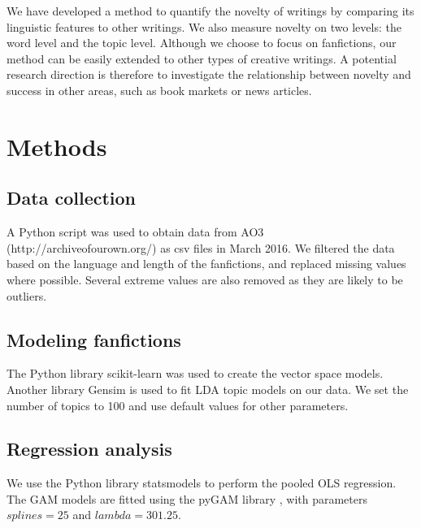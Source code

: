 \documentclass[a4paper]{article}
\begin{document}
We have developed a method to quantify the novelty of writings by comparing its linguistic features to other writings. We also measure novelty on two levels: the word level and the topic level. Although we choose to focus on fanfictions, our method can be easily extended to other types of creative writings. A potential research direction is therefore to investigate the relationship between novelty and success in other areas, such as book markets or news articles. 



\section*{Methods}

\subsection*{Data collection}
A Python script was used to obtain data from AO3 (http://archiveofourown.org/) as csv files in March 2016. We filtered the data based on the language and length of the fanfictions, and replaced missing values where possible. Several extreme values are also removed as they are likely to be outliers.

\subsection*{Modeling fanfictions}
The Python library scikit-learn was used to create the vector space models. Another library Gensim is used to fit LDA topic models on our data. We set the number of topics to 100 and use default values for other parameters. 

\subsection*{Regression analysis}
We use the Python library statsmodels \cite{seabold2010statsmodels} to perform the pooled OLS regression. The GAM models are fitted using the pyGAM library \cite{pygam}, with parameters $splines=25$ and $lambda=301.25$.





    
\end{document}
